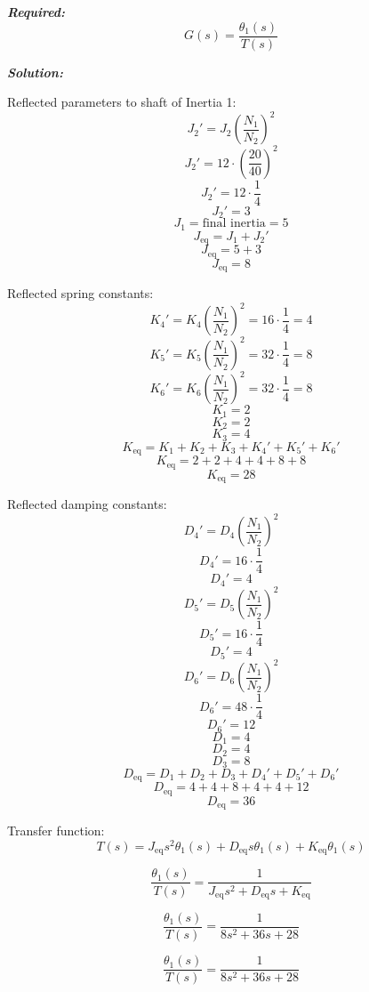 \documentclass[11pt]{article}
\begin{document}
\vspace{12pt}

\noindent \textbf{\textit{Required:}}
\[
G(s) = \frac{\theta_1(s)}{T(s)}
\]

\vspace{12pt}


\noindent\textbf{\textit{Solution:}}

Reflected parameters to shaft of Inertia 1:
\[
J_2' = J_2 \left( \frac{N_1}{N_2} \right)^2 
\]
\[
J_2' = 12 \cdot \left( \frac{20}{40} \right)^2 
\]
\[
J_2' = 12 \cdot \frac{1}{4} 
\]
\[
J_2' = 3
\]
\[
J_1 = \text{final inertia} = 5
\]
\[
J_{\text{eq}} = J_1 + J_2' 
\]
\[
J_{\text{eq}} = 5 + 3 
\]
\[
J_{\text{eq}} = 8
\]

Reflected spring constants:
\[
K_4' = K_4 \left( \frac{N_1}{N_2} \right)^2 = 16 \cdot \frac{1}{4} = 4
\]
\[
K_5' = K_5 \left( \frac{N_1}{N_2} \right)^2 = 32 \cdot \frac{1}{4} = 8
\]
\[
K_6' = K_6 \left( \frac{N_1}{N_2} \right)^2 = 32 \cdot \frac{1}{4} = 8
\]
\[
K_1 = 2
\]
\[
K_2 = 2
\]
\[
K_3 = 4
\]
\[
K_{\text{eq}} = K_1 + K_2 + K_3 + K_4' + K_5' + K_6' 
\]
\[
K_{\text{eq}} = 2 + 2 + 4 + 4 + 8 + 8 
\]
\[
K_{\text{eq}} = 28
\]

Reflected damping constants:
\[
D_4' = D_4 \left( \frac{N_1}{N_2} \right)^2 
\]
\[
D_4' = 16 \cdot \frac{1}{4} 
\]
\[
D_4' = 4
\]
\[
D_5' = D_5 \left( \frac{N_1}{N_2} \right)^2 
\]
\[
D_5' = 16 \cdot \frac{1}{4} 
\]
\[
D_5' = 4
\]
\[
D_6' = D_6 \left( \frac{N_1}{N_2} \right)^2 
\]
\[
D_6' = 48 \cdot \frac{1}{4} 
\]
\[
D_6' = 12
\]
\[
D_1 = 4
\]
\[
D_2 = 4
\]
\[
D_3 = 8
\]
\[
D_{\text{eq}} = D_1 + D_2 + D_3 + D_4' + D_5' + D_6' 
\]
\[
D_{\text{eq}} = 4 + 4 + 8 + 4 + 4 + 12 
\]
\[
D_{\text{eq}} = 36
\]

Transfer function:
\[
T(s) = J_{\text{eq}} s^2 \theta_1(s) + D_{\text{eq}} s \theta_1(s) + K_{\text{eq}} \theta_1(s)
\]

\[
\frac{\theta_1(s)}{T(s)} = \frac{1}{J_{\text{eq}} s^2 + D_{\text{eq}} s + K_{\text{eq}}}
\]

\[
\frac{\theta_1(s)}{T(s)} = \frac{1}{8 s^2 + 36 s + 28}
\]

\[
\boxed{\frac{\theta_1(s)}{T(s)} = \frac{1}{8 s^2 + 36 s + 28}}
\]


\end{document}
